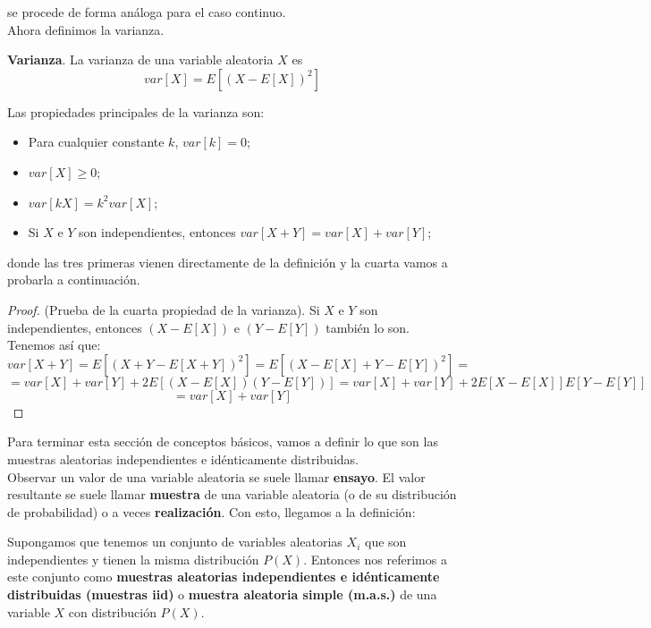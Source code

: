 se procede de forma análoga para el caso continuo.\\
Ahora definimos la varianza.
\begin{definicion}
\textbf{Varianza}. La varianza de una variable aleatoria $X$ es
\[ var[X]=E[(X-E[X])^{2}] \]
\end{definicion}
Las propiedades principales de la varianza son:
\begin{itemize}
 \item Para cualquier constante $k$, $var[k]=0$;
 \item $var[X] \geq 0$;
 \item $var[kX]=k^{2}var[X]$;
 \item Si $X$ e $Y$ son independientes, entonces $var[X+Y]=var[X]+var[Y]$;
\end{itemize}
donde las tres primeras vienen directamente de la definición y la cuarta vamos a probarla a continuación.
\begin{proof}
(Prueba de la cuarta propiedad de la varianza). Si $X$ e $Y$ son independientes, entonces $(X-E[X])$ e $(Y-E[Y])$ también lo son. Tenemos así que:
\[ var[X+Y]=E[(X+Y-E[X+Y])^{2}]=E[(X-E[X]+Y-E[Y])^{2}]= \]
\[ =var[X]+var[Y]+2E[(X-E[X])(Y-E[Y])]=var[X]+var[Y]+2E[X-E[X]]E[Y-E[Y]] \]
\[ =var[X]+var[Y] \]
\end{proof}
Para terminar esta sección de conceptos básicos, vamos a definir lo que son las muestras aleatorias independientes e idénticamente distribuidas.\\
Observar un valor de una variable aleatoria se suele llamar \textbf{ensayo}. El valor resultante se suele llamar \textbf{muestra} de una variable aleatoria (o de su distribución de probabilidad) o a veces \textbf{realización}. Con esto, llegamos a la definición:
\begin{definicion}
Supongamos que tenemos un conjunto de variables aleatorias $X_{i}$ que son independientes y tienen la misma distribución $P(X)$. Entonces nos referimos a este conjunto como \textbf{muestras aleatorias independientes e idénticamente distribuidas (muestras iid)} o \textbf{muestra aleatoria simple (m.a.s.)} de una variable $X$ con distribución $P(X)$.  \cite{forsyth2018probability}
\end{definicion}

